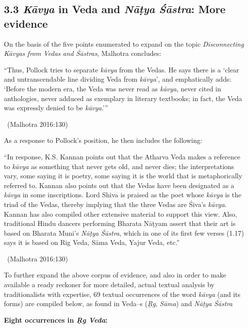 \subsection*{3.3 \textit{Kāvya} in Veda and \textit{Nāṭya Śāstra}: More evidence}

On the basis of the five points enumerated to expand on the topic \textit{Disconnecting Kāvyas from Vedas and Śāstras}, Malhotra concludes:

\begin{myquote}
 “Thus, Pollock tries to separate \textit{kāvya} from the Vedas. He says there is a ‘clear and untranscendable line dividing Veda from \textit{kāvya}’, and emphatically adds: ‘Before the modern era, the Veda was never read as \textit{kāvya}, never cited in anthologies, never adduced as exemplary in literary textbooks; in fact, the Veda was expressly denied to be \textit{kāvya}.’” 

~\hfill (Malhotra 2016:130)
\end{myquote}

As a response to Pollock’s position, he then includes the following:

\begin{myquote}
“In response, K.S. Kannan points out that the Atharva Veda makes a reference to \textit{kāvya} as something that never gets old, and never dies; the interpretations vary, some saying it is poetry, some saying it is the world that is metaphorically referred to. Kannan also points out that the Vedas have been designated as a \textit{kāvya} in some inscriptions. Lord Shiva is praised as the poet whose \textit{kāvya} is the triad of the Vedas, thereby implying that the three Vedas are Śiva’s \textit{kāvya}. Kannan has also compiled other extensive material to support this view. Also, traditional Hindu dancers performing Bharata Nāṭyam assert that their art is based on Bharata Muni’s \textit{Nāṭya Śāstra}, which in one of its first few verses (1.17) says it is based on Rig Veda, Sāma Veda, Yajur Veda, etc.” 

~\hfill (Malhotra 2016:130)
\end{myquote}

To further expand the above corpus of evidence, and also in order to make available a ready reckoner for more detailed, actual textual analysis by traditionalists with expertise, 69 textual occurrences of the word \textit{kāvya} (and its forms) are compiled below, as found in Veda–s (\textit{Ṛg}, \textit{Sāma}) and \textit{Nāṭya Śāstra}

\textbf{Eight occurrences in \textit{Ṛg Veda}:}

